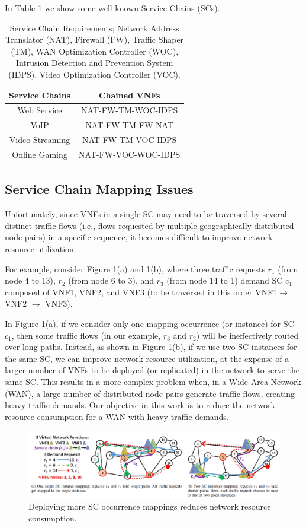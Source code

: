 \documentclass[12pt]{article}
\begin{document}
In Table \ref{table:1} we show some well-known Service Chains (SCs). \\
\begin{table}[t!]
\centering
\begin{tabular}{|c c|} 
 \hline
 Service Chains & Chained VNFs \\ [0.5ex] 
 \hline 
 Web Service & NAT-FW-TM-WOC-IDPS\\ 
VoIP &NAT-FW-TM-FW-NAT \\
 Video Streaming & NAT-FW-TM-VOC-IDPS \\
 Online Gaming&NAT-FW-VOC-WOC-IDPS\\[1ex] 
 \hline
\end{tabular}
\caption{Service Chain Requirements; Network Address Translator (NAT), Firewall (FW), Traffic Shaper (TM), WAN Optimization Controller (WOC), Intrusion Detection and Prevention System (IDPS), Video Optimization Controller (VOC).}
\label{table:1}
\end{table}

\subsection{Service Chain Mapping Issues}
Unfortunately, since VNFs in a single SC may need to be traversed by several distinct traffic flows (i.e., flows requested by multiple geographically-distributed node pairs) in a specific sequence, it becomes difficult to improve network resource utilization.

For example, consider Figure 1(a) and 1(b), where three traffic requests $r_1$ (from node 4 to 13), $r_2$ (from node 6 to 3), and $r_3$ (from node 14 to 1) demand SC $c_1$ composed of VNF1, VNF2, and VNF3 (to be traversed in this order VNF1$\rightarrow$ VNF2  $\rightarrow$ VNF3).

In Figure 1(a), if we consider only one mapping occurrence (or instance) for SC $c_1$, then some traffic flows (in our example, $r_3$ and $r_2$) will be ineffectively routed over long paths. Instead, as shown in Figure 1(b), if we use two SC instances for the same SC, we can improve network resource utilization, at the expense of a larger number of VNFs to be deployed (or replicated) in the network to serve the same SC. This results in a more complex problem when, in a Wide-Area Network (WAN), a large number of distributed node pairs generate traffic flows, creating heavy traffic demands. Our objective in this work is to reduce the network resource consumption for a WAN with heavy traffic demands.
\begin{figure}[t!] \label{fig:1}
  \includegraphics[width=\linewidth]{fig1.png}
  \caption{Deploying more SC occurrence mappings reduces network resource consumption.}
\end{figure}
\end{document}
